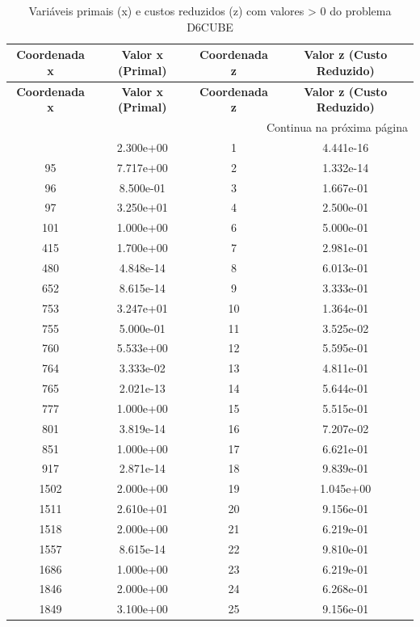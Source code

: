 \documentclass[12pt]{article}
\begin{document}
\begin{longtable}{@{}cccc@{}}
\caption{Variáveis primais (x) e custos reduzidos (z) com valores > 0 do problema D6CUBE} \\
\toprule
\textbf{Coordenada x} & \textbf{Valor x (Primal)} & \textbf{Coordenada z} & \textbf{Valor z (Custo Reduzido)} \\
\midrule
\endfirsthead

\toprule
\textbf{Coordenada x} & \textbf{Valor x (Primal)} & \textbf{Coordenada z} & \textbf{Valor z (Custo Reduzido)} \\
\midrule
\endhead

\midrule \multicolumn{4}{r}{{Continua na próxima página}} \\ \midrule
\endfoot

\bottomrule
\endlastfoot
94 & 2.300e+00 & 1 & 4.441e-16 \\
95 & 7.717e+00 & 2 & 1.332e-14 \\
96 & 8.500e-01 & 3 & 1.667e-01 \\
97 & 3.250e+01 & 4 & 2.500e-01 \\
101 & 1.000e+00 & 6 & 5.000e-01 \\
415 & 1.700e+00 & 7 & 2.981e-01 \\
480 & 4.848e-14 & 8 & 6.013e-01 \\
652 & 8.615e-14 & 9 & 3.333e-01 \\
753 & 3.247e+01 & 10 & 1.364e-01 \\
755 & 5.000e-01 & 11 & 3.525e-02 \\
760 & 5.533e+00 & 12 & 5.595e-01 \\
764 & 3.333e-02 & 13 & 4.811e-01 \\
765 & 2.021e-13 & 14 & 5.644e-01 \\
777 & 1.000e+00 & 15 & 5.515e-01 \\
801 & 3.819e-14 & 16 & 7.207e-02 \\
851 & 1.000e+00 & 17 & 6.621e-01 \\
917 & 2.871e-14 & 18 & 9.839e-01 \\
1502 & 2.000e+00 & 19 & 1.045e+00 \\
1511 & 2.610e+01 & 20 & 9.156e-01 \\
1518 & 2.000e+00 & 21 & 6.219e-01 \\
1557 & 8.615e-14 & 22 & 9.810e-01 \\
1686 & 1.000e+00 & 23 & 6.219e-01 \\
1846 & 2.000e+00 & 24 & 6.268e-01 \\
1849 & 3.100e+00 & 25 & 9.156e-01 \\

\end{longtable}
\end{document}
